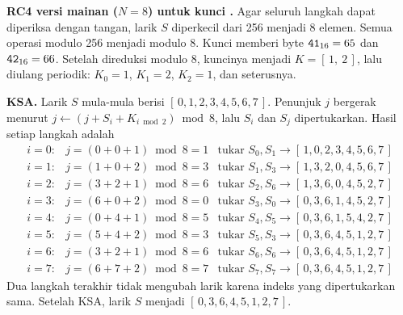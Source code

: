 \begin{example}
\textbf{RC4 versi mainan ($N=8$) untuk kunci .} Agar seluruh langkah
dapat diperiksa dengan tangan, larik $S$ diperkecil dari 256 menjadi 8 elemen.
Semua operasi modulo 256 menjadi modulo 8. Kunci  memberi byte
$\texttt{41}_{16}=65$ dan $\texttt{42}_{16}=66$. Setelah direduksi modulo 8,
kuncinya menjadi $K=[\,1,\ 2\,]$, lalu diulang periodik: $K_0=1$, $K_1=2$,
$K_2=1$, dan seterusnya.

\textbf{KSA.} Larik $S$ mula-mula berisi $[\,0,1,2,3,4,5,6,7\,]$. Penunjuk $j$
bergerak menurut $j \leftarrow (j + S_i + K_{i \bmod 2}) \bmod 8$, lalu $S_i$
dan $S_j$ dipertukarkan. Hasil setiap langkah adalah
\[
\begin{array}{cll}
i=0: & j = (0+0+1) \bmod 8 = 1 & \text{tukar } S_0,S_1
      \rightarrow [\,1,0,2,3,4,5,6,7\,]\\
i=1: & j = (1+0+2) \bmod 8 = 3 & \text{tukar } S_1,S_3
      \rightarrow [\,1,3,2,0,4,5,6,7\,]\\
i=2: & j = (3+2+1) \bmod 8 = 6 & \text{tukar } S_2,S_6
      \rightarrow [\,1,3,6,0,4,5,2,7\,]\\
i=3: & j = (6+0+2) \bmod 8 = 0 & \text{tukar } S_3,S_0
      \rightarrow [\,0,3,6,1,4,5,2,7\,]\\
i=4: & j = (0+4+1) \bmod 8 = 5 & \text{tukar } S_4,S_5
      \rightarrow [\,0,3,6,1,5,4,2,7\,]\\
i=5: & j = (5+4+2) \bmod 8 = 3 & \text{tukar } S_5,S_3
      \rightarrow [\,0,3,6,4,5,1,2,7\,]\\
i=6: & j = (3+2+1) \bmod 8 = 6 & \text{tukar } S_6,S_6
      \rightarrow [\,0,3,6,4,5,1,2,7\,]\\
i=7: & j = (6+7+2) \bmod 8 = 7 & \text{tukar } S_7,S_7
      \rightarrow [\,0,3,6,4,5,1,2,7\,]
\end{array}
\]
Dua langkah terakhir tidak mengubah larik karena indeks yang dipertukarkan
sama. Setelah KSA, larik $S$ menjadi $[\,0,3,6,4,5,1,2,7\,]$.


\end{example}
